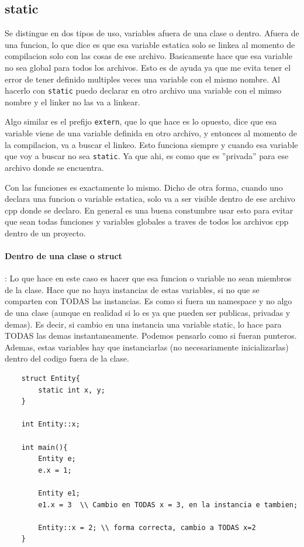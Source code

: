 \documentclass[11pt]{article}
\begin{document}
\subsection{static}
Se distingue en dos tipos de uso, variables afuera de una clase o dentro.
Afuera de una funcion, lo que dice es que esa variable estatica solo se linkea al
momento de compilacion solo con las cosas de ese archivo.
Basicamente hace que esa variable no sea global para todos los archivos.
Esto es de ayuda ya que me evita tener el error de tener definido multiples veces
una variable con el mismo nombre.
Al hacerlo con \texttt{static} puedo declarar en otro archivo una variable
con el mimso nombre y el linker no las va a linkear.

Algo similar es el prefijo \texttt{extern}, que lo que hace es lo opuesto,
dice que esa variable viene de una variable definida en otro archivo, y entonces
al momento de la compilacion, va a buscar el linkeo.
Esto funciona siempre y cuando esa variable que voy a buscar no sea \texttt{static}.
Ya que ahi, es como que es ''privada'' para ese archivo donde se encuentra.

Con las funciones es exactamente lo mismo.
Dicho de otra forma, cuando uno declara una funcion o variable estatica,
solo va a ser visible dentro de ese archivo cpp donde se declaro.
En general es una buena constumbre usar esto para evitar que sean todas
funciones y variables globales a traves de todos los archivos cpp dentro de un
proyecto.

\paragraph{Dentro de una clase o struct}:
Lo que hace en este caso es hacer que esa funcion o variable no sean miembros de
la clase.
Hace que no haya instancias de estas variables, si no que se comparten con TODAS
las instancias.
Es como si fuera un namespace y no algo de una clase (aunque en realidad si lo
es ya que pueden ser publicas, privadas y demas).
Es decir, si cambio en una instancia una variable static, lo hace para TODAS
las demas instantaneamente.
Podemos pensarlo como si fueran punteros.
Ademas, estas variables hay que instanciarlas (no necesariamente inicializarlas)
dentro del codigo fuera de la clase.

\begin{lstlisting}
    struct Entity{
        static int x, y;
    }

    int Entity::x;

    int main(){
        Entity e;
        e.x = 1;

        Entity e1;
        e1.x = 3  \\ Cambio en TODAS x = 3, en la instancia e tambien;

        Entity::x = 2; \\ forma correcta, cambio a TODAS x=2
    }
\end{lstlisting}
\end{document}
